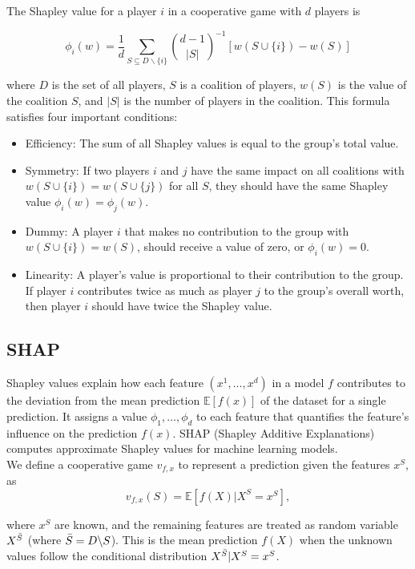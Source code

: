 The Shapley value for a player $i$ in a cooperative game with $d$ players is

\begin{equation}
    \phi_i(w) = \frac{1}{d} \sum_{S \subseteq D \backslash \{ i \} } \binom{d-1}{|S|}^{-1} \left[ w(S\cup \{ i \} ) - w(S) \right]
\end{equation}

where $D$ is the set of all players, $S$ is a coalition of players, $w(S)$ is the value of the coalition $S$, and $|S|$ is the number of players in the coalition.
This formula satisfies four important conditions:
\begin{itemize}
    \item Efficiency: The sum of all Shapley values is equal to the group's total value.
    \item Symmetry: If two players $i$ and $j$ have the same impact on all coalitions with $w(S \cup \{i\}) = w(S \cup \{j\})$ for all $S$, they should have the same Shapley value $\phi_i(w) = \phi_j(w)$.
    \item Dummy: A player $i$ that makes no contribution to the group with $w(S \cup \{i\}) = w(S)$, should receive a value of zero, or $\phi_i(w)=0$.
    \item Linearity: A player's value is proportional to their contribution to the group.
If player $i$ contributes twice as much as player $j$ to the group's overall worth, then player $i$ should have twice the Shapley value.
\end{itemize}

\subsection{SHAP}
Shapley values explain how each feature $(x^1, \dots, x^d)$ in a model $f$ contributes to the deviation from the mean prediction $\mathbb{E}[f(x)]$ of the dataset for a single prediction.
It assigns a value $\phi_1, \dots, \phi_d$ to each feature that quantifies the feature's influence on the prediction $f(x)$.
SHAP (Shapley Additive Explanations) computes approximate Shapley values for machine learning models.\\

We define a cooperative game $v_{f,x}$ to represent a prediction given the features $x^S$, as
\begin{equation}
    v_{f,x}(S) = \mathbb{E} \left[ f(X) | X^S = x^S \right],
\end{equation}

where $x^S$ are known, and the remaining features are treated as random variable $X^{\Bar{S}}$ (where $\Bar{S} = D \backslash S$).
This is the mean prediction $f(X)$ when the unknown values follow the conditional distribution $X^{\Bar{S}} | X^S = x^S$.\\

